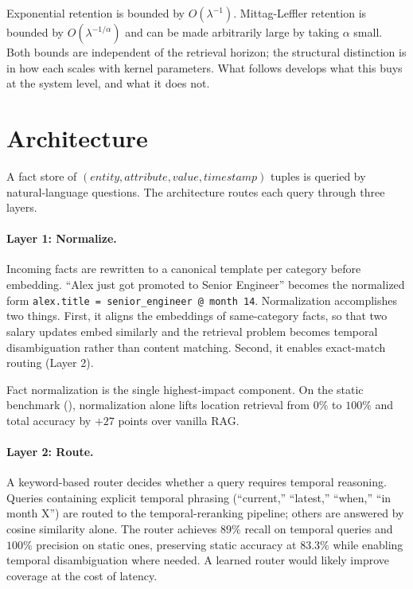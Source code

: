 \documentclass[11pt]{article}
\theoremstyle{plain}
\theoremstyle{definition}
\begin{document}
Exponential retention is bounded by $O(\lambda^{-1})$.
Mittag-Leffler retention is bounded by $O(\lambda^{-1/\alpha})$
and can be made arbitrarily large by taking $\alpha$ small.
Both bounds are independent of the retrieval horizon; the
structural distinction is in how each scales with kernel
parameters.  What follows develops what this buys at the
system level, and what it does not.


\section{Architecture}\label{sec:architecture}

A fact store of $(entity, attribute, value, timestamp)$
tuples is queried by natural-language questions.  The
architecture routes each query through three layers.

\paragraph{Layer 1: Normalize.}  Incoming facts are
rewritten to a canonical template per category before
embedding.  ``Alex just got promoted to Senior
Engineer'' becomes the normalized form
\texttt{alex.title = senior\_engineer @ month 14}.
Normalization accomplishes two things.  First, it
aligns the embeddings of same-category facts, so that
two salary updates embed similarly and the retrieval
problem becomes temporal disambiguation rather than
content matching.  Second, it enables exact-match
routing (Layer 2).

Fact normalization is the single highest-impact
component.  On the static benchmark (),
normalization alone lifts location retrieval from
$0\%$ to $100\%$ and total accuracy by $+27$ points
over vanilla RAG.

\paragraph{Layer 2: Route.}  A keyword-based router
decides whether a query requires temporal reasoning.
Queries containing explicit temporal phrasing
(``current,'' ``latest,'' ``when,'' ``in month X'')
are routed to the temporal-reranking pipeline; others
are answered by cosine similarity alone.  The router
achieves $89\%$ recall on temporal queries and $100\%$
precision on static ones, preserving static accuracy
at $83.3\%$ while enabling temporal disambiguation
where needed.  A learned router would likely improve
coverage at the cost of latency.
\end{document}
